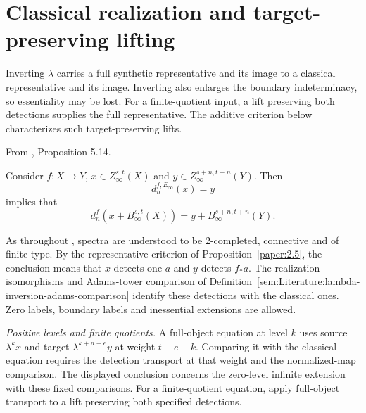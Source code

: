 
\section{Classical realization and target-preserving lifting}

Inverting $\lambda$ carries a full synthetic representative and its
image to a classical representative and its image. Inverting also
enlarges the boundary indeterminacy, so essentiality may be lost.
For a finite-quotient input, a lift preserving both detections supplies
the full representative. The additive criterion below characterizes
such target-preserving lifts.


\begin{proposition}
\label{paper:5.14}
From \cite{LWX126}, Proposition 5.14.\par

Consider $f: X\to Y$, $x\in Z_\infty^{s,t}(X)$ and $y\in Z_\infty^{s+n,t+n}(Y)$.
    Then
    $$d^{f,E_\infty}_n(x)=y$$
    implies that
    $$d^{f}_n(x+B_\infty^{s,t}(X))=y+B_\infty^{s+n,t+n}(Y).$$


As throughout \cite{LWX126}, spectra are understood to be 2-completed,
connective and of finite type. By the representative criterion of
Proposition~\ref{paper:2.5}, the conclusion means that
$x$ detects one $a$ and $y$ detects $f_*a$. The realization isomorphisms and Adams-tower comparison of
Definition~\ref{sem:Literature:lambda-inversion-adams-comparison}
identify these detections with the classical ones.
Zero labels, boundary labels and inessential extensions are allowed.

\textit{Positive levels and finite quotients.}
A full-object equation at level $k$ uses source $\lambda^kx$
and target $\lambda^{k+n-e}y$ at weight $t+e-k$.
Comparing it with the classical equation requires the detection
transport at that weight and the normalized-map comparison.
The displayed conclusion concerns the zero-level infinite extension
with these fixed comparisons.
For a finite-quotient equation, apply full-object transport to a
lift preserving both specified detections.
\end{proposition}
